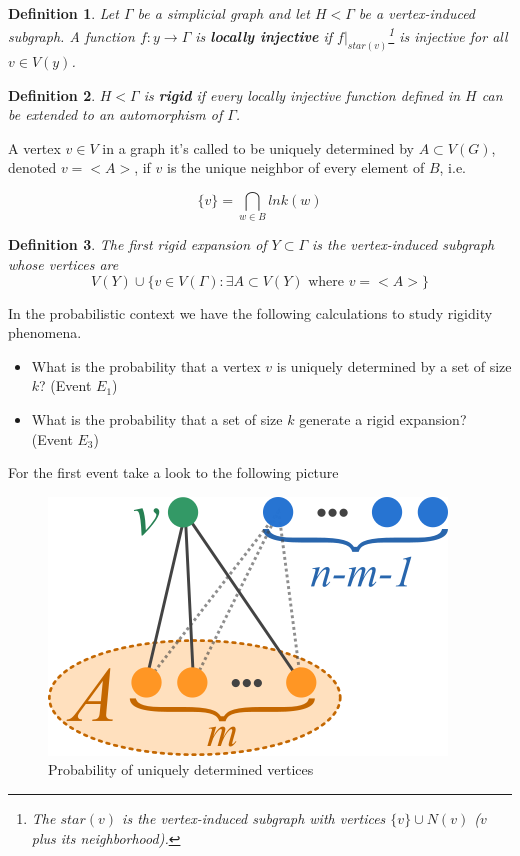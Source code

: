 \documentclass[a4paper]{tufte-handout}
\newtheorem{defini}{Definition}[theorem]
\begin{document}
\begin{defini}
Let $\Gamma$ be a simplicial graph and let $H<\Gamma$ be a vertex-induced subgraph. A function $f:y\to \Gamma$ is \textbf{locally injective} if $f|_{star(v)}$\footnote{The $star(v)$ is the vertex-induced subgraph with vertices $\{ v \} \cup N(v)$ ($v$ plus its neighborhood).} is injective for all $v \in V(y)$. 
\end{defini}

\begin{defini}
$H<\Gamma$ is \textbf{rigid} if every locally injective function defined in $H$ can be extended to an automorphism of $\Gamma$. \end{defini}

A vertex $v \in V$ in a graph it's called to be uniquely determined by $A\subset V(G)$, denoted $v=<A>$, if $v$ is the unique neighbor of every element of $B$, i.e.

$$ \{ v \} = \bigcap_{w\in B} lnk(w) $$

\begin{defini}
The first rigid expansion of $Y\subset \Gamma$ is the vertex-induced subgraph whose vertices are
$$ V(Y) \cup \{ v\in V(\Gamma) :  \exists A \subset V(Y) \text{ where } v = <A>  \}$$
\end{defini}

In the probabilistic context we have the following calculations to study rigidity phenomena.

\begin{itemize}
\item What is the probability that a vertex $v$ is uniquely determined by a set of size $k$? (Event $E_1$)
 \item What is the probability that a set of size $k$ generate a rigid expansion? (Event $E_3$)
\end{itemize}

For the first event take a look to the following picture

\begin{figure}[h!]
	\centering
	\includegraphics[scale=0.8]{figures/uni.png}
	\caption{Probability of uniquely determined vertices}
\end{figure}
\end{document}
